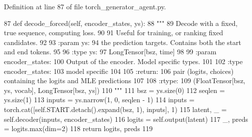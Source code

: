 Definition at line 87 of file torch\+\_\+generator\+\_\+agent.\+py.


\begin{DoxyCode}
87     \textcolor{keyword}{def }decode\_forced(self, encoder\_states, ys):
88         \textcolor{stringliteral}{"""}
89 \textcolor{stringliteral}{        Decode with a fixed, true sequence, computing loss.}
90 \textcolor{stringliteral}{}
91 \textcolor{stringliteral}{        Useful for training, or ranking fixed candidates.}
92 \textcolor{stringliteral}{}
93 \textcolor{stringliteral}{        :param ys:}
94 \textcolor{stringliteral}{            the prediction targets. Contains both the start and end tokens.}
95 \textcolor{stringliteral}{}
96 \textcolor{stringliteral}{        :type ys:}
97 \textcolor{stringliteral}{            LongTensor[bsz, time]}
98 \textcolor{stringliteral}{}
99 \textcolor{stringliteral}{        :param encoder\_states:}
100 \textcolor{stringliteral}{            Output of the encoder. Model specific types.}
101 \textcolor{stringliteral}{}
102 \textcolor{stringliteral}{        :type encoder\_states:}
103 \textcolor{stringliteral}{            model specific}
104 \textcolor{stringliteral}{}
105 \textcolor{stringliteral}{        :return:}
106 \textcolor{stringliteral}{            pair (logits, choices) containing the logits and MLE predictions}
107 \textcolor{stringliteral}{}
108 \textcolor{stringliteral}{        :rtype:}
109 \textcolor{stringliteral}{            (FloatTensor[bsz, ys, vocab], LongTensor[bsz, ys])}
110 \textcolor{stringliteral}{        """}
111         bsz = ys.size(0)
112         seqlen = ys.size(1)
113         inputs = ys.narrow(1, 0, seqlen - 1)
114         inputs = torch.cat([self.START.detach().expand(bsz, 1), inputs], 1)
115         latent, \_ = self.decoder(inputs, encoder\_states)
116         logits = self.output(latent)
117         \_, preds = logits.max(dim=2)
118         \textcolor{keywordflow}{return} logits, preds
119 
\end{DoxyCode}
\mbox{\label{classparlai_1_1core_1_1torch__generator__agent_1_1TorchGeneratorModel_a5f1915200b6a8c6518fe17889d2b7cdc}} 
